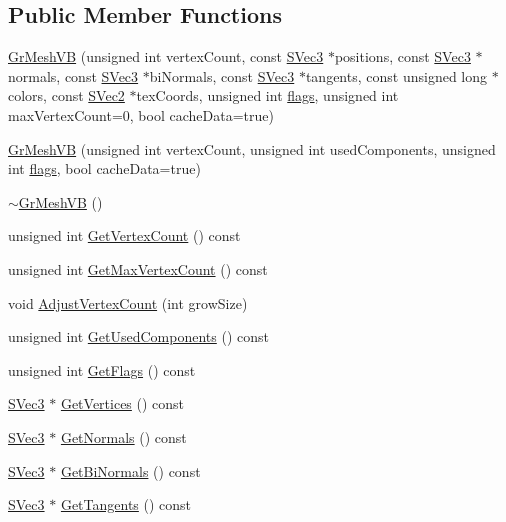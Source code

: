 \subsection*{Public Member Functions}
\begin{CompactItemize}
\item 
\hyperlink{class_gr_mesh_v_b_0d3edf08e72919b89d6a1195459dcd4f}{GrMeshVB} (unsigned int vertexCount, const \hyperlink{struct_s_vec3}{SVec3} $\ast$positions, const \hyperlink{struct_s_vec3}{SVec3} $\ast$normals, const \hyperlink{struct_s_vec3}{SVec3} $\ast$biNormals, const \hyperlink{struct_s_vec3}{SVec3} $\ast$tangents, const unsigned long $\ast$colors, const \hyperlink{struct_s_vec2}{SVec2} $\ast$texCoords, unsigned int \hyperlink{_u_t_message_8h_0a3c0b351ab09281b662a9ff4f900a53}{flags}, unsigned int maxVertexCount=0, bool cacheData=true)
\item 
\hyperlink{class_gr_mesh_v_b_fcd057b800d11fa70e1fd977df27d278}{GrMeshVB} (unsigned int vertexCount, unsigned int usedComponents, unsigned int \hyperlink{_u_t_message_8h_0a3c0b351ab09281b662a9ff4f900a53}{flags}, bool cacheData=true)
\item 
\hyperlink{class_gr_mesh_v_b_f6686b7165c23fc5236d81ecb715e1ed}{$\sim$GrMeshVB} ()
\item 
unsigned int \hyperlink{class_gr_mesh_v_b_c0e59bbbe7c8d4e6421733e77db0e3e1}{GetVertexCount} () const 
\item 
unsigned int \hyperlink{class_gr_mesh_v_b_44d690384a6aa9f08cf5a9dc9916cf53}{GetMaxVertexCount} () const 
\item 
void \hyperlink{class_gr_mesh_v_b_c19226bb73e91cba8be18520a8f8749f}{AdjustVertexCount} (int growSize)
\item 
unsigned int \hyperlink{class_gr_mesh_v_b_a9b69737d099558bab475e194f0d6048}{GetUsedComponents} () const 
\item 
unsigned int \hyperlink{class_gr_mesh_v_b_81536894ff71ce167c18ca1067e85f63}{GetFlags} () const 
\item 
\hyperlink{struct_s_vec3}{SVec3} $\ast$ \hyperlink{class_gr_mesh_v_b_3c4fc1231bfcca44bf3a4d8427d2774a}{GetVertices} () const 
\item 
\hyperlink{struct_s_vec3}{SVec3} $\ast$ \hyperlink{class_gr_mesh_v_b_6b7123162415ba4473262949117cf4bc}{GetNormals} () const 
\item 
\hyperlink{struct_s_vec3}{SVec3} $\ast$ \hyperlink{class_gr_mesh_v_b_f52a7b54ced28a889947a58929290d1e}{GetBiNormals} () const 
\item 
\hyperlink{struct_s_vec3}{SVec3} $\ast$ \hyperlink{class_gr_mesh_v_b_70c4f13e33162b71528a02287a33a744}{GetTangents} () const 

\end{CompactItemize}
